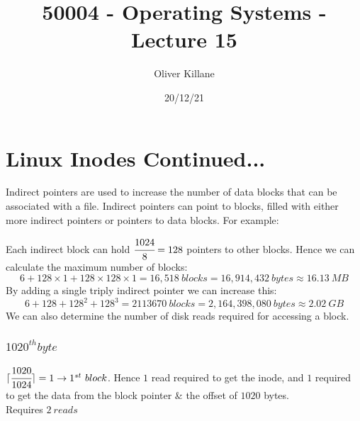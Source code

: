 \documentclass{report}
\title{50004 - Operating Systems - Lecture 15}
\author{Oliver Killane}
\date{20/12/21}
\begin{document}
    \maketitle

    \section*{Linux Inodes Continued...}
        Indirect pointers are used to increase the number of data blocks that can be associated with a file. Indirect pointers can point to blocks, filled with either more indirect pointers or pointers to data blocks.
        For example:
        \\ 

        Each indirect block can hold $\cfrac{1024}{8} = 128$ pointers to other blocks. Hence we can calculate the  maximum number of blocks:
        \[6 + 128 \times 1 + 128 \times 128 \times 1 = 16,518 \ blocks = 16,914,432 \ bytes \approx 16.13 \ MB\]
        By adding a single triply indirect pointer we can increase this:
        \[6 + 128 + 128^2 + 128^3 = 2113670 \ blocks = 2,164,398,080 \ bytes \approx 2.02 \ GB\]
        We can also determine the number of disk reads required for accessing a block.
        \\ 
        \subsubsection*{$1020^{th} byte$}
            $\lceil \cfrac{1020}{1024} \rceil = 1  \to 1^{st} \ block$. Hence $1$ read required to get the inode, and $1$ required to get the data from the block pointer \& the offset of $1020$ bytes.
            \\ Requires \textbf{$2 \ reads$}
\end{document}

